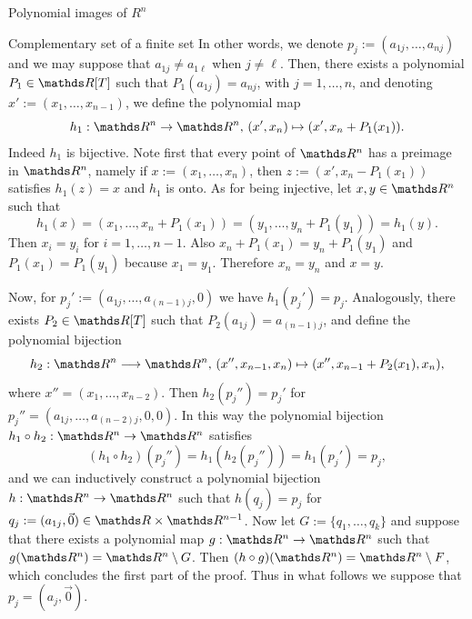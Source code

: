 \documentclass[11pt, a4paper, english, twoside, notitlepage, openright]{report}
\begin{document}
\begin{chapter}{Polynomial images of $R^n$}
\begin{section}{Complementary set of a finite set}
In other words, we denote $p_j:=(a_{1j},\dots,a_{nj})$ and we may suppose that $a_{1j}\neq a_{1\ell}$ when $j\neq\ell$. Then, there exists a polynomial $P_1\in\R[T]$ such that $P_1(a_{1j})=a_{nj}$, with $j = 1,\dots, n$, and denoting $x':=(x_1,\dots,x_{n-1})$, we  define the polynomial map 
$$
h_1:\R^n\to\R^n,\, (x',x_n)\mapsto (x',x_n+P_1(x_1)).
$$
Indeed $h_1$ is bijective. Note first that every point of $\R^n$ has a preimage in $\R^n$, namely if $x:=(x_1, \dots,x_n)$, then $z:=(x',x_n-P_1(x_1))$ satisfies $h_1(z)=x$ and $h_1$ is onto. As for being injective, let $x,y\in\R^n$ such that 
$$
h_1(x)=(x_1,\dots,x_n+ P_1(x_1))=(y_1,\dots,y_n+ P_1(y_1))=h_1(y).
$$ 
Then $x_i=y_i$ for $i=1,\dots,n-1$. Also $x_n+P_1(x_1)=y_n+P_1(y_1)$ and $P_1(x_1)=P_1(y_1)$ because $x_1= y_1$. Therefore $x_n=y_n$ and $x=y$.
		
Now, for $p_j':=(a_{1j},\dots,a_{(n-1)j},0)$ we have $h_1(p_j')=p_j$. Analogously, there exists $P_2\in\R[T]$ such that $P_2(a_{1j}) = a_{(n-1)j}$, and define the polynomial bijection
$$
h_2:\R^n\longrightarrow \R^n,\,(x'',x_{n-1},x_n)\mapsto (x'',x_{n-1}+P_2(x_1),x_n),
$$
where $x''=(x_1,\dots,x_{n-2})$. Then $h_2(p_j'')=p_j'$ for $p_j''= (a_{1j},\dots,a_{(n-2)j},0,0)$. In this way the polynomial bijection $h_1\circ h_2:\R^n\to\R^n$ satisfies
$$
(h_1\circ h_2)(p_j'')=h_1(h_2(p_j''))=h_1(p_j')=p_j,
$$
and we can inductively construct a polynomial bijection $h:\R^n\rightarrow\R^n$ such that $h(q_j)=p_j$ for $q_j:=(a_{1j},\vec{0})\in\R\times\R^{n-1}$. Now let $G:=\{q_1,\dots,q_k\}$ and suppose that there exists a polynomial map $g:\R^n\rightarrow\R^n$ such that $g(\R^n)=\R^n\setminus G$. Then $(h\circ g)(\R^n) = \R^n \setminus F$, which concludes the first part of the proof. Thus in what follows we suppose that $p_j=(a_j,\vec{0})$.
		

\end{section}
\end{chapter}
\end{document}
